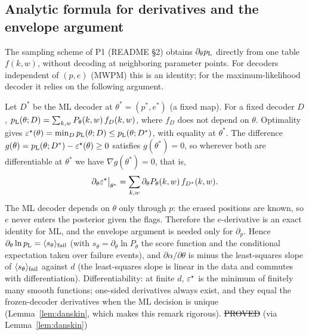 \subsection{Analytic formula for derivatives and the envelope argument}\label{sec:envelope}

The sampling scheme of P1 (README \S2) obtains $\partial_\theta p_{\mathrm{L}}$ directly from one table $f(k,w)$, without decoding at neighboring parameter points. For decoders independent of $(p,e)$ (MWPM) this is an identity;
for the maximum-likelihood decoder it relies on the following argument.

\begin{remark}\label{rem:envelope}
Let $D^\ast$ be the ML decoder at $\theta^\ast=(p^\ast,e^\ast)$ (a fixed map). For a fixed decoder $D$,
$p_{\mathrm{L}}(\theta;D)=\sum_{k,w}P_\theta(k,w)\,f_D(k,w)$, where $f_D$ does not depend on $\theta$. Optimality gives $\varepsilon^{\star}(\theta)=\min_Dp_{\mathrm{L}}(\theta;D)\le p_{\mathrm{L}}(\theta;D^\ast)$,
with equality at $\theta^\ast$. The difference $g(\theta)=p_{\mathrm{L}}(\theta;D^\ast)-\varepsilon^{\star}(\theta)\ge0$ satisfies $g(\theta^\ast)=0$, so wherever both are differentiable at $\theta^\ast$ we have $\nabla g(\theta^\ast)=0$, that is,
\[
\partial_\theta\varepsilon^{\star}\big|_{\theta^\ast}=\sum_{k,w}\partial_\theta P_\theta(k,w)\,f_{D^\ast}(k,w).
\]
The ML decoder depends on $\theta$ only through $p$: the erased positions are known, so $e$ never enters the posterior given the flags. Therefore
the $e$-derivative is an exact identity for ML, and the envelope argument is needed only for $\partial_p$.
Hence $\partial_\theta\ln p_{\mathrm{L}}=\langle s_\theta\rangle_{\rm fail}$ (with $s_\theta=\partial_\theta\ln P_\theta$ the score function and the conditional expectation taken over failure events),
and $\partial\alpha/\partial\theta$ is minus the least-squares slope of $\langle s_\theta\rangle_{\rm fail}$ against $d$ (the least-squares slope is linear in the data and commutes with differentiation).
Differentiability: at finite $d$, $\varepsilon^{\star}$ is the minimum of finitely many smooth functions; one-sided derivatives always exist, and they equal the frozen-decoder derivatives when the ML decision is unique (Lemma~\ref{lem:danskin}, which makes this remark rigorous).
\hfill\st{PROVED} (via Lemma~\ref{lem:danskin})
\end{remark}

